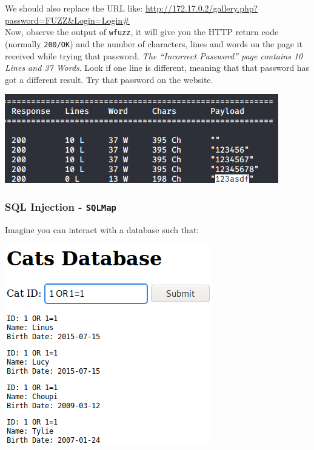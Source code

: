 \documentclass{article}
\begin{document}
\noindent We should also replace the URL like:
\url{http://172.17.0.2/gallery.php?password=FUZZ&Login=Login#}\\
Now, observe the output of \lstinline{wfuzz}, it will give you the HTTP return code (normally \lstinline{200/OK}) and the number of characters, lines and words on the page it received while trying that password. \textit{The “Incorrect Password” page contains 10 Lines and 37 Words}. Look if one line is different, meaning that that password has got a different result. Try that password on the website.

\begin{center}
    \includegraphics[scale=0.65]{imageTP/1.png}
\end{center}

\subsubsection{SQL Injection - \lstinline{SQLMap}}
Imagine you can interact with a database such that:
\begin{center}
    \includegraphics[scale=0.65]{imageTP/2.png}
\end{center}
\end{document}
